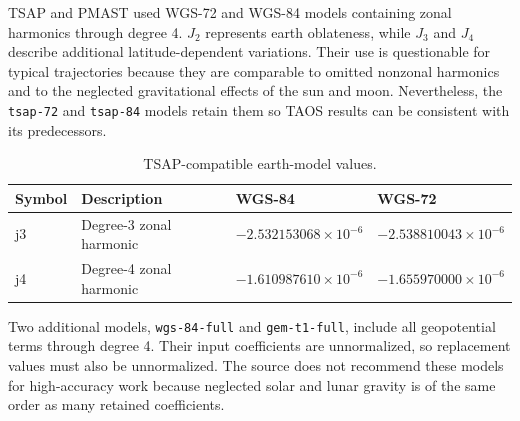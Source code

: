 
TSAP and PMAST used WGS-72 and WGS-84 models containing zonal harmonics
through degree 4. $J_2$ represents earth oblateness, while $J_3$ and $J_4$ describe
additional latitude-dependent variations. Their use is questionable for typical
trajectories because they are comparable to omitted nonzonal harmonics and to the
neglected gravitational effects of the sun and moon. Nevertheless, the
\texttt{tsap-72} and \texttt{tsap-84} models retain them so TAOS results can be
consistent with its predecessors.

\begin{table}[htbp]
  \centering
  \caption{TSAP-compatible earth-model values.}
  \label{tab:tsap-compatible-earth-values}
  \begin{tabularx}{0.84\linewidth}{@{}>{\ttfamily}lXll@{}}
    \toprule
    \normalfont Symbol & Description & WGS-84 & WGS-72 \\
    \midrule
    j3 & Degree-3 zonal harmonic & $-2.532153068\times10^{-6}$ & $-2.538810043\times10^{-6}$ \\
    j4 & Degree-4 zonal harmonic & $-1.610987610\times10^{-6}$ & $-1.655970000\times10^{-6}$ \\
    \bottomrule
  \end{tabularx}
\end{table}


Two additional models, \texttt{wgs-84-full} and \texttt{gem-t1-full}, include all
geopotential terms through degree 4. Their input coefficients are unnormalized, so
replacement values must also be unnormalized. The source does not recommend
these models for high-accuracy work because neglected solar and lunar gravity is of
the same order as many retained coefficients.

